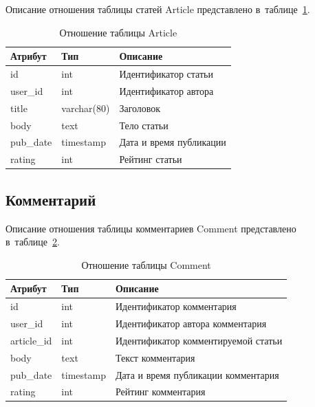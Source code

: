 Описание отношения таблицы статей Article представлено в~таблице~\ref{tbl:myblog_article}.

\begin{table}[H]
	\centering
	\caption{Отношение таблицы Article}
	\label{tbl:myblog_article}
	\begin{tabular}{|l|l|l|}
		\hline
		\textbf{Атрибут} & \textbf{Тип} & \textbf{Описание}       \\ \hline
		id               & int          & Идентификатор статьи    \\ \hline
		user\_id         & int          & Идентификатор автора    \\ \hline
		title            & varchar(80)  & Заголовок               \\ \hline
		body             & text         & Тело статьи             \\ \hline
		pub\_date        & timestamp    & Дата и время публикации \\ \hline
		rating           & int          & Рейтинг статьи          \\ \hline
	\end{tabular}
\end{table}

\subsection{Комментарий}

Описание отношения таблицы комментариев Comment представлено в~таблице~\ref{tbl:myblog_comment}.

\begin{table}[H]
	\centering
	\caption{Отношение таблицы Comment}
	\label{tbl:myblog_comment}
	\begin{tabular}{|l|l|l|}
		\hline
		\textbf{Атрибут} & \textbf{Тип} & \textbf{Описание}                   \\ \hline
		id               & int          & Идентификатор комментария           \\ \hline
		user\_id         & int          & Идентификатор автора комментария    \\ \hline
		article\_id      & int          & Идентификатор комментируемой статьи \\ \hline
		body             & text         & Текст комментария                   \\ \hline
		pub\_date        & timestamp    & Дата и время публикации комментария \\ \hline
		rating           & int          & Рейтинг комментария                 \\ \hline
	\end{tabular}
\end{table}

